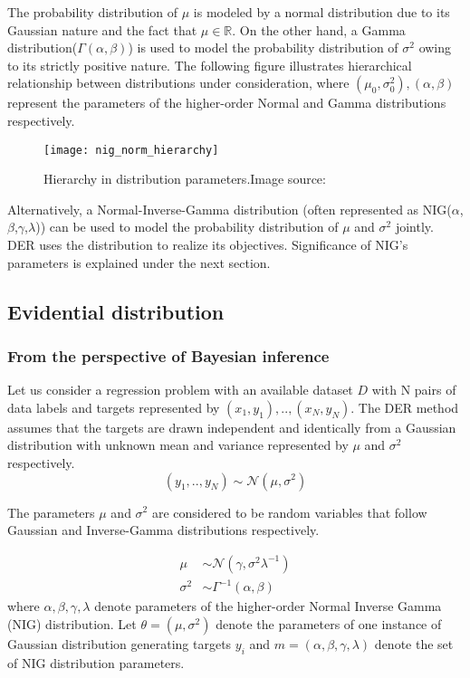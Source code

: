 	The probability distribution of $\mu$ is modeled by a normal distribution due to its Gaussian nature and the fact that $\mu \in \mathbb{R}$. On the other hand, a Gamma distribution($\Gamma(\alpha,\beta)$) is used to model the probability distribution of $\sigma^2$ owing to its strictly positive nature. The following figure illustrates hierarchical relationship between distributions under consideration, where $(\mu_0,\sigma^{2}_0),(\alpha,\beta)$ represent the parameters of the higher-order Normal and Gamma distributions respectively.
	
	\begin{figure}[h]
		\centering
		\texttt{[image: nig\_norm\_hierarchy]}
		\caption{Hierarchy in distribution parameters.Image source: }
		\label{fig_nig_norm_hierarchy}
	\end{figure}
	
	Alternatively, a Normal-Inverse-Gamma distribution (often represented as NIG($\alpha$,$\beta$,$\gamma$,$\lambda$)) can be used to model the probability distribution of $\mu$ and $\sigma^2$ jointly. DER uses the distribution to realize its objectives. Significance of NIG's parameters is explained under the next section.
	
	\subsection{Evidential distribution}\label{sec_evidential_dist}
	\subsubsection{From the perspective of Bayesian inference}\label{sec_persp_bayes}
	Let us consider a regression problem with an available dataset $D$ with N pairs of data labels and targets represented by $(x_1,y_1),..,(x_N,y_N)$. The DER method assumes that the targets are  drawn independent and identically from a Gaussian distribution with unknown mean and variance represented by $\mu$ and $\sigma^2$ respectively.
	\begin{equation}
		(y_1,..,y_N) \sim \mathcal{N}(\mu,\sigma^2)
	\end{equation} 
	
	The parameters $\mu$ and $\sigma^2$ are considered to be random variables that follow Gaussian and Inverse-Gamma distributions respectively.
	
	\begin{align}
		\mu &\sim \mathcal{N}(\gamma,\sigma^2\lambda^{-1})\\
		\sigma^2 &\sim \Gamma^{-1}(\alpha,\beta)
	\end{align}
	where $\alpha, \beta, \gamma, \lambda$ denote parameters of the higher-order Normal Inverse Gamma (NIG) distribution. Let $\theta = (\mu,\sigma^2)$ denote the parameters of one instance of Gaussian distribution generating targets $y_{i}$  and $m = (\alpha, \beta, \gamma, \lambda)$ denote the set of NIG distribution parameters.
	
